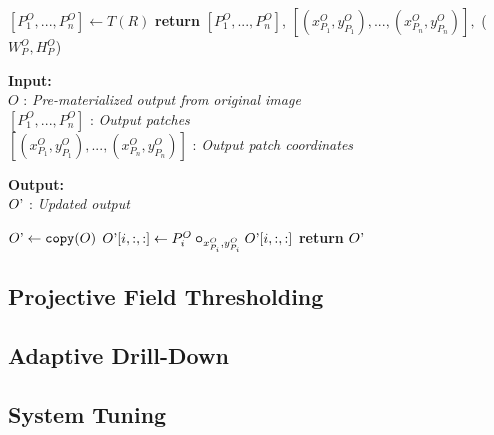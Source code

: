 \begin{algorithm}
\begin{algorithmic}[1]
    \State $[P^O_1,...,P^O_n] \gets T(R)$
    \State \textbf{return} $[P^O_1,...,P^O_n]$, $[(x^O_{P_1},y^O_{P_1}),...,(x^O_{P_n},y^O_{P_n})],$
    \State \hspace*{20mm} ($W^O_P,H^O_P$) 
    \EndProcedure
    \end{algorithmic}

    \vspace*{-2mm}
    \hrulefill
    
    \begin{flushleft}
     \hspace*{4mm} \textbf{Input:}\\
     \hspace*{8mm} $O$ : \textit{Pre-materialized output from original image}\\
     \hspace*{8mm} $[P^O_1,...,P^O_n]$ : \textit{Output patches}\\
     \hspace*{8mm} $[(x^O_{P_1},y^O_{P_1}),...,(x^O_{P_n},y^O_{P_n})]$ : \textit{Output patch coordinates}\\
    \end{flushleft}

    \begin{flushleft}
     \hspace*{4mm} \textbf{Output:}\\
     \hspace*{8mm} $O\textrm'$ : \textit{Updated output}
    \end{flushleft}
	\begin{algorithmic}[1]
    \State $O\textrm' \gets \texttt{copy}(O)$
    	\State $O\textrm'[i,:,:] \gets P^O_i \bm\circ_{x^O_{P_i},y^O_{P_i}} O\textrm'[i,:,:]$
    \EndFor
    \State \textbf{return} $O\textrm'$
    \EndProcedure

    \end{algorithmic}
\end{algorithm}

\subsection{Projective Field Thresholding}

\subsection{Adaptive Drill-Down}

\subsection{System Tuning}
